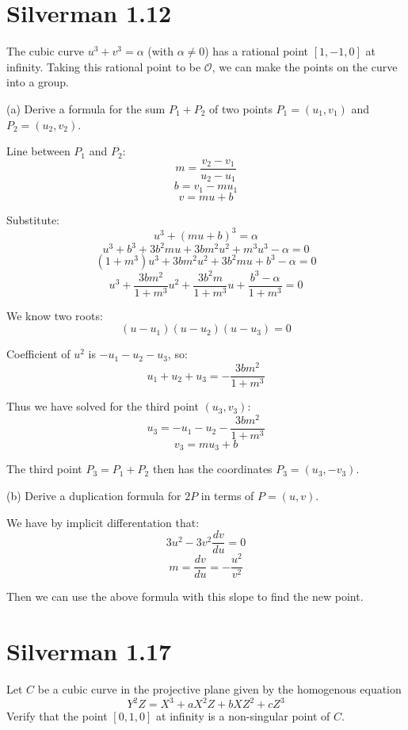 \documentclass{article}
\begin{document}

\section{Silverman 1.12}
The cubic curve $u^3 + v^3 = \alpha$ (with $\alpha \neq 0$) has a rational point $[1,-1,0]$ at infinity. Taking this rational point to be $\mathcal{O}$, we can make the points on the curve into a group.

(a) Derive a formula for the sum $P_1 + P_2$ of two points $P_1 = (u_1, v_1)$ and $P_2 = (u_2, v_2)$.

Line between $P_1$ and $P_2$:
$$m = \frac{v_2 - v_1}{u_2 - u_1}$$
$$b = v_1 - mu_1$$
$$v = mu + b$$

Substitute:
$$u^3 + (mu + b)^3 = \alpha$$
$$u^3 + b^3 + 3b^2mu + 3bm^2u^2 + m^3u^3 - \alpha = 0$$
$$(1+m^3) u^3 + 3bm^2 u^2 + 3b^2m u + b^3 - \alpha = 0$$
$$u^3 + \frac{3bm^2}{1+m^3}u^2 + \frac{3b^2m}{1+m^3}u + \frac{b^3-\alpha}{1+m^3} = 0$$

We know two roots:
$$(u-u_1)(u-u_2)(u-u_3) = 0$$

Coefficient of $u^2$ is $-u_1-u_2-u_3$, so:
$$u_1 + u_2 + u_3 = -\frac{3bm^2}{1+m^3}$$

Thus we have solved for the third point $(u_3,v_3)$:
$$u_3 = - u_1 - u_2 - \frac{3bm^2}{1+m^3}$$
$$v_3 = mu_3 + b$$

The third point $P_3 = P_1 + P_2$ then has the coordinates $P_3 = (u_3, -v_3)$.

(b) Derive a duplication formula for $2P$ in terms of $P = (u,v)$.

We have by implicit differentation that:
$$3u^2 - 3v^2 \frac{dv}{du} = 0$$
$$m = \frac{dv}{du} = -\frac{u^2}{v^2}$$

Then we can use the above formula with this slope to find the new point.


\section{Silverman 1.17}
Let $C$ be a cubic curve in the projective plane given by the homogenous equation 
$$Y^2 Z = X^3 + aX^2 Z + bXZ^2 + cZ^3$$
Verify that the point $[0,1,0]$ at infinity is a non-singular point of $C$.
\end{document}
